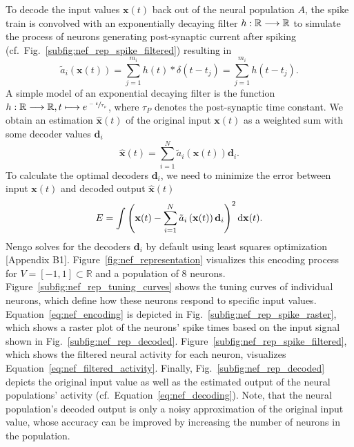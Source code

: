 To decode the input values $\mathbf{x}(t)$ back out of the neural population $A$, the spike train is convolved with an exponentially decaying filter $h: \mathbb{R} \longrightarrow \mathbb{R}$ to simulate the process of neurons generating post-synaptic current after spiking (cf.\ Fig.~\ref{subfig:nef_rep_spike_filtered}) resulting in
\begin{equation}
\tilde{a}_{i}\left(\mathbf{x}(t)\right) = \sum_{j=1}^{m_{i}} h(t) \ast \delta(t - t_{j}) = \sum_{j=1}^{m_{i}} h(t - t_{j}).
\label{eq:nef_filtered_activity}
\end{equation}
A simple model of an exponential decaying filter is the function $h: \mathbb{R} \longrightarrow \mathbb{R}, t \longmapsto e^{\sfrac{-t}{\tau_{p}}}$, where $\tau_{P}$ denotes the post-synaptic time constant.
We obtain an estimation $\mathbf{\hat{x}}(t)$ of the original input $\mathbf{x}(t)$ as a weighted sum with some decoder values $\mathbf{d}_{i}$
\begin{equation}
\mathbf{\hat{x}}(t) = \sum_{i=1}^{N} \tilde{a}_{i}\left(\mathbf{x}(t)\right) \mathbf{d}_{i}.
\label{eq:nef_decoding}
\end{equation}
To calculate the optimal decoders $\mathbf{d}_{i}$, we need to minimize the error between input $\mathbf{x}(t)$ and decoded output $\mathbf{\hat{x}}(t)$
\begin{equation}
E = \int \left( \mathbf{x}(t) - \sum_{i=1}^{N} \tilde{a}_{i}\left(\mathbf{x}(t)\right) \mathbf{d}_{i}\right)^{2} \mathop{}\!\mathrm{d} \mathbf{x}(t).
\label{eq:decoder_calculation}
\end{equation}
\ac{Nengo} solves for the decoders $\mathbf{d}_{i}$ by default using least squares optimization \parencite{Eliasmith2013}[Appendix B1].
Figure~\ref{fig:nef_representation} visualizes this encoding process for $V = \left[ -1, 1\right] \subset \mathbb{R}$ and a population of $8$ neurons.
Figure~\ref{subfig:nef_rep_tuning_curves} shows the tuning curves of individual neurons, which define how these neurons respond to specific input values.
Equation~\eqref{eq:nef_encoding} is depicted in Fig.~\ref{subfig:nef_rep_spike_raster}, which shows a raster plot of the neurons' spike times based on the input signal shown in Fig.~\ref{subfig:nef_rep_decoded}.
Figure~\ref{subfig:nef_rep_spike_filtered}, which shows the filtered neural activity for each neuron, visualizes Equation~\eqref{eq:nef_filtered_activity}.
Finally, Fig.~\ref{subfig:nef_rep_decoded} depicts the original input value as well as the estimated output of the neural populations' activity (cf.\ Equation~\eqref{eq:nef_decoding}).
Note, that the neural population's decoded output is only a noisy approximation of the original input value, whose accuracy can be improved by increasing the number of neurons in the population.

